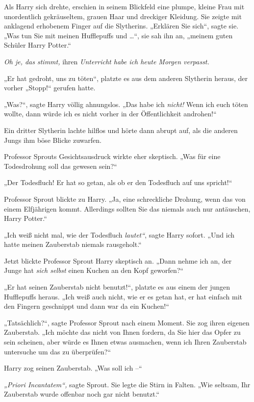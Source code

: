 {Als Harry sich drehte, erschien in seinem Blickfeld eine plumpe, kleine Frau mit unordentlich gekräuseltem, grauen Haar und dreckiger Kleidung. Sie zeigte mit anklagend erhobenem Finger auf die Slytherins. „Erklären Sie sich“, sagte sie. „Was tun Sie mit meinen Hufflepuffs und …“, sie sah ihn an, „meinem guten Schüler Harry Potter.“

\emph{Oh je, das stimmt,} ihren \emph{Unterricht habe ich heute Morgen verpasst.}

„Er hat gedroht, uns zu töten“, platzte es aus dem anderen Slytherin heraus, der vorher „Stopp!“ gerufen hatte.

„Was?“, sagte Harry völlig ahnungslos. „Das habe ich \emph{nicht!} Wenn ich euch töten wollte, dann würde ich es nicht vorher in der Öffentlichkeit androhen!“

Ein dritter Slytherin lachte hilflos und hörte dann abrupt auf, als die anderen Jungs ihm böse Blicke zuwarfen.

Professor Sprouts Gesichtsausdruck wirkte eher skeptisch. „Was für eine Todesdrohung soll das gewesen sein?“

„Der Todesfluch! Er hat so getan, als ob er den Todesfluch auf uns spricht!“

Professor Sprout blickte zu Harry. „Ja, eine schreckliche Drohung, wenn das von einem Elfjährigen kommt. Allerdings sollten Sie das niemals auch nur antäuschen, Harry Potter.“

„Ich weiß nicht mal, wie der Todesfluch \emph{lautet“}, sagte Harry sofort. „Und ich hatte meinen Zauberstab niemals rausgeholt.“

Jetzt blickte Professor Sprout Harry skeptisch an. „Dann nehme ich an, der Junge hat \emph{sich selbst} einen Kuchen an den Kopf geworfen?“

„Er hat seinen Zauberstab nicht benutzt!“, platzte es aus einem der jungen Hufflepuffs heraus. „Ich weiß auch nicht, wie er es getan hat, er hat einfach mit den Fingern geschnippt und dann war da ein Kuchen!“

„Tatsächlich?“, sagte Professor Sprout nach einem Moment. Sie zog ihren eigenen Zauberstab. „Ich möchte das nicht von Ihnen fordern, da Sie hier das Opfer zu sein scheinen, aber würde es Ihnen etwas ausmachen, wenn ich Ihren Zauberstab untersuche um das zu überprüfen?“

Harry zog seinen Zauberstab. „Was soll ich --“

\emph{„Priori Incantatem“,} sagte Sprout. Sie legte die Stirn in Falten. „Wie seltsam, Ihr Zauberstab wurde offenbar noch gar nicht benutzt.“

}
